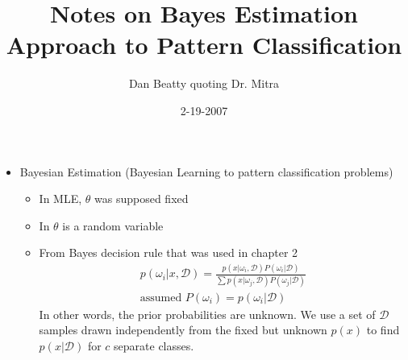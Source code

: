\documentclass[11pt]{article}
\title{Notes on Bayes Estimation Approach to Pattern Classification}
\author{Dan Beatty quoting Dr. Mitra}
\date{2-19-2007}                                           %
\begin{document}
\maketitle


\begin{itemize}
	\item Bayesian Estimation (Bayesian Learning to pattern classification problems)
	\begin{itemize}
		\item In MLE, $\theta$ was supposed fixed
		\item In $\theta$ is a random variable
		\item From Bayes decision rule that was used in chapter 2
		\begin{eqnarray}
		p(\omega_i | x, \mathcal{D}) = \frac{p( x | \omega_i, \mathcal{D}) P(\omega_i | \mathcal{D})} {\sum p (x| \omega_j , \mathcal{D}) P (\omega_j | \mathcal{D})} \\
		\textrm{assumed } P (\omega_i) = p ( \omega_i | \mathcal{D})
		\end{eqnarray}
		In other words, the prior probabilities are unknown.  We use a set of $\mathcal{D}$ samples drawn independently from the fixed but unknown $p(x)$ to find $p(x| \mathcal{D})$ for $c$ separate classes.  


\end{itemize}
\end{itemize}
\end{document}
